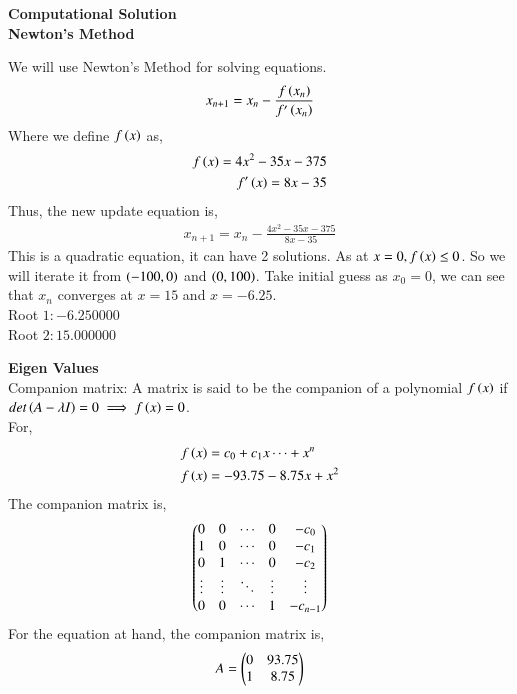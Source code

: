\documentclass[journal]{IEEEtran}
\begin{document}
\textbf{Computational Solution}\\
\textbf{Newton's Method}

We will use Newton's Method for solving equations.
\begin{align}
	x_{n+1} = x_n - \frac{f\left(x_n\right)}{f^{\prime}\left(x_n\right)} 
\end{align}
Where we define $f\left(x\right)$ as, 
\begin{align}
	f\left(x\right) = 4x^2 - 35x - 375 \\
	f^{\prime}\left(x\right) = 8x -35 
\end{align}
Thus, the new update equation is, 
\begin{align}
	x_{n+1} = x_n - \frac{4x^2 - 35x - 375}{8x -35} 
\end{align}
This is a quadratic equation, it can have 2 solutions. As at $x=0,f\left(x\right) \leq 0$. So we will iterate it from $ \left(-100,0\right) $ and $\left(0,100\right)$. Take initial guess as $x_0 = 0$, we can see that $x_n$ converges at $x=15$ and $x=-6.25$.\\
Root $1: -6.250000$\\
Root $2: 15.000000$


\textbf{Eigen Values}\\
Companion matrix: A matrix is said to be the companion of a polynomial $f\left(x\right)$ if 
$det\left(A - \lambda I\right) = 0 \implies f\left(x\right) = 0$. 
\\
For,
\begin{align}
  f\left(x\right) &= c_0 + c_1 x \cdots + x^n\\
  f\left(x\right) &=-93.75-8.75x+x^2
\end{align}
The companion matrix is,
\begin{align}
  \begin{pmatrix}
    0 & 0 & \cdots & 0 & -c_0\\
    1 & 0 & \cdots & 0 & -c_1\\
    0 & 1 & \cdots & 0 & -c_2\\
    \vdots & \vdots & \ddots & \vdots & \vdots\\
    0 & 0 & \cdots & 1 & -c_{n-1}\\
  \end{pmatrix}
\end{align}
For the equation at hand, the companion matrix is,
\begin{align}
  A= \begin{pmatrix}
    0 & 93.75\\
    1 & 8.75
  \end{pmatrix}
\end{align}
\end{document}
